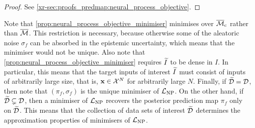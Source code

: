 \documentclass[12pt, twoside]{report}
\newcommand{\xrprefix}[1]{xr-#1}
\begin{document}
\begin{proof}
    See \cref{\xrprefix{sec:proofs_predmap:neural_process_objective}}.
\end{proof}


Note that \cref{prop:neural_process_objective_minimiser} minimises over $\overline{\M}\ss{c}$ rather than $\overline{\mathcal{M}}$.
This restriction is necessary, because otherwise some of the aleatoric noise $\sigma_f$ can be absorbed in the epistemic uncertainty, which means that the minimiser would not be unique.
Also note that \cref{prop:neural_process_objective_minimiser} requires $\widetilde{I}$ to be dense in $I$.
In particular, this means that the target inputs of interest $\widetilde{I}$ must consist of inputs of arbitrarily large size, that is, $\mathbf{x} \in \mathcal{X}^N$ for arbitrarily large $N$.
Finally, if $\widetilde{\mathcal{D}} = \mathcal{D}$, then note that $(\pi_f, \sigma_f)$ is the unique minimiser of $\L\ss{NP}$.
On the other hand, if $\widetilde{\mathcal{D}} \subsetneq \mathcal{D}$, then
 a minimiser of $\L\ss{NP}$ recovers the posterior prediction map $\pi_f$ only on $\widetilde{\mathcal{D}}$.
This means that the collection of data sets of interest $\widetilde{\mathcal{D}}$ determines the approximation properties of minimisers of $\L\ss{NP}$.
\end{document}
